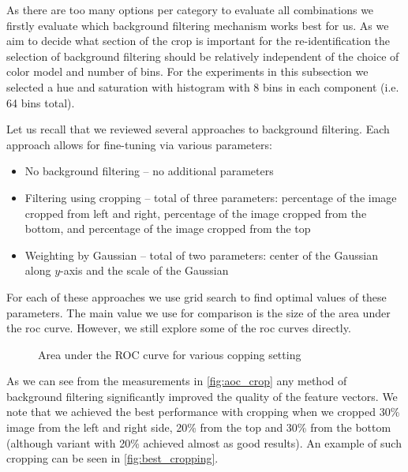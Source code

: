 As there are too many options per category to evaluate all combinations we
firstly evaluate which background filtering mechanism works best for us. As we
aim to decide what section of the crop is important for the re-identification
the selection of background filtering should be relatively independent of
the choice of color model and number of bins. For the experiments in this
subsection we selected a hue and saturation with histogram with 8 bins in
each component (i.e. 64 bins total).

Let us recall that we reviewed several approaches to background filtering.
Each approach allows for fine-tuning via various parameters:

\begin{itemize}
    \item No background filtering -- no additional parameters
    \item Filtering using cropping -- total of three parameters: percentage of the image cropped from left and right, percentage of the image cropped from the bottom, and percentage of the image cropped from the top
    \item Weighting by Gaussian -- total of two parameters: center of the Gaussian along $y$-axis and the scale of the Gaussian
\end{itemize}

For each of these approaches we use grid search to find optimal values of
these parameters. The main value we use for comparison is the size of the
area under the \gls{roc} curve. However, we still explore some of the
\gls{roc} curves directly.

\begin{figure}
    \centering
    \def\svgwidth{\columnwidth}
    \Large
    \scalebox{0.6}{}
    \scalebox{0.6}{}
    \scalebox{0.6}{}
    \caption{Area under the ROC curve for various copping setting}
    \label{fig:aoc_crop}
\end{figure}

As we can see from the measurements in \autoref{fig:aoc_crop} any method of background filtering significantly improved the quality of the feature vectors. We note that we achieved the best performance with cropping when we 
cropped 30\% image from the left and right side, 20\% from the top and 30\%
from the bottom (although variant with 20\% achieved almost as good results). An example of such cropping can be seen in
\autoref{fig:best_cropping}.

